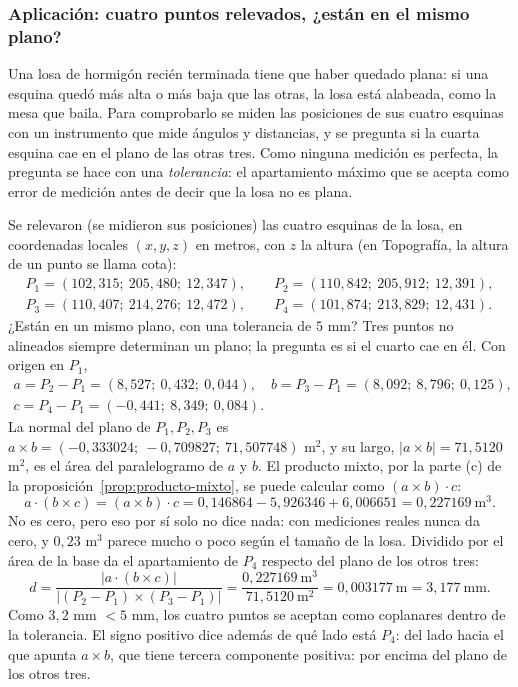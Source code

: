 \subsubsection{Aplicación: cuatro puntos relevados, ¿están en el mismo plano?}

Una losa de hormigón recién terminada tiene que haber quedado plana: si una esquina quedó
más alta o más baja que las otras, la losa está alabeada, como la mesa que baila. Para
comprobarlo se miden las posiciones de sus cuatro esquinas con un instrumento que mide
ángulos y distancias, y se pregunta si la cuarta esquina cae en el plano de las otras tres.
Como ninguna medición es perfecta, la pregunta se hace con una \emph{tolerancia}: el
apartamiento máximo que se acepta como error de medición antes de decir que la losa no es
plana.

Se relevaron (se midieron sus posiciones) las cuatro esquinas de la losa, en coordenadas
locales \((x,y,z)\) en metros, con \(z\) la altura (en Topografía, la altura de un punto se
llama cota):
\begin{gather*}
  P_1=(102{,}315;\ 205{,}480;\ 12{,}347),\qquad P_2=(110{,}842;\ 205{,}912;\ 12{,}391),\\
  P_3=(110{,}407;\ 214{,}276;\ 12{,}472),\qquad P_4=(101{,}874;\ 213{,}829;\ 12{,}431).
\end{gather*}
¿Están en un mismo plano, con una tolerancia de \(5\) mm? Tres puntos no alineados siempre
determinan un plano; la pregunta es si el cuarto cae en él. Con origen en \(P_1\),
\[
  \begin{gathered}
  a=P_2-P_1=(8{,}527;\ 0{,}432;\ 0{,}044),\quad
  b=P_3-P_1=(8{,}092;\ 8{,}796;\ 0{,}125),\\
  c=P_4-P_1=(-0{,}441;\ 8{,}349;\ 0{,}084).
  \end{gathered}
\]
La normal del plano de \(P_1,P_2,P_3\) es
\(a\times b=(-0{,}333024;\ -0{,}709827;\ 71{,}507748)\) m\(^2\), y su largo, \(\lvert a\times b\rvert=71{,}5120\) m\(^2\), es el área del paralelogramo de
\(a\) y \(b\). El producto mixto, por la parte (c) de la
proposición~\ref{prop:producto-mixto}, se puede calcular como \((a\times b)\cdot c\):
\[
  a\cdot(b\times c)=(a\times b)\cdot c=0{,}146864-5{,}926346+6{,}006651
  =0{,}227169\ \text{m}^3 .
\]
No es cero, pero eso por sí solo no dice nada: con mediciones reales nunca da cero, y
\(0{,}23\) m\(^3\) parece mucho o poco según el tamaño de la losa. Dividido por el área de la
base da el apartamiento de \(P_4\) respecto del plano de los otros tres:
\[
  d=\frac{\lvert a\cdot(b\times c)\rvert}{\lvert (P_2-P_1)\times(P_3-P_1)\rvert}
  =\frac{0{,}227169\ \text{m}^3}{71{,}5120\ \text{m}^2}=0{,}003177\ \text{m}=3{,}177\ \text{mm}.
\]
Como \(3{,}2\) mm \(<5\) mm, los cuatro puntos se aceptan como coplanares dentro de la
tolerancia. El signo positivo dice además de qué lado está \(P_4\): del lado hacia el que
apunta \(a\times b\), que tiene tercera componente positiva: por encima del plano de los otros
tres.

